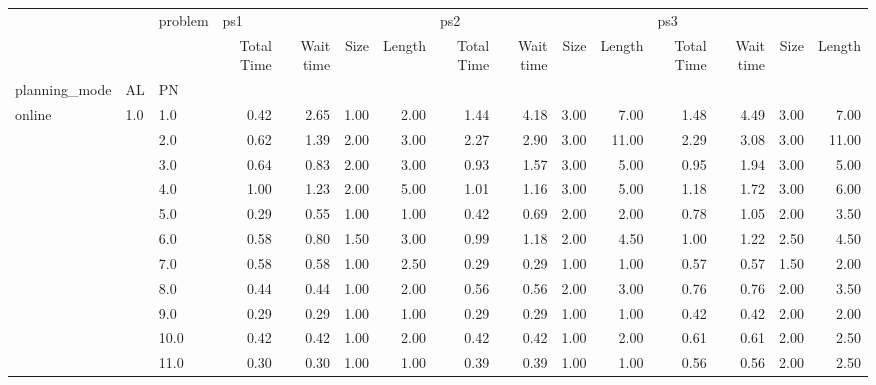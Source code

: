 \begin{tabular}{lllrrrrrrrrrrrr}
\toprule
       &     & problem & \multicolumn{4}{l}{ps1} & \multicolumn{4}{l}{ps2} & \multicolumn{4}{l}{ps3} \\
       &     & {} & Total Time & Wait time & Size & Length & Total Time & Wait time & Size & Length & Total Time & Wait time & Size & Length \\
planning\_mode & AL & PN &            &           &      &        &            &           &      &        &            &           &      &        \\
\midrule
online & 1.0 & 1.0  &       0.42 &      2.65 & 1.00 &   2.00 &       1.44 &      4.18 & 3.00 &   7.00 &       1.48 &      4.49 & 3.00 &   7.00 \\
       &     & 2.0  &       0.62 &      1.39 & 2.00 &   3.00 &       2.27 &      2.90 & 3.00 &  11.00 &       2.29 &      3.08 & 3.00 &  11.00 \\
       &     & 3.0  &       0.64 &      0.83 & 2.00 &   3.00 &       0.93 &      1.57 & 3.00 &   5.00 &       0.95 &      1.94 & 3.00 &   5.00 \\
       &     & 4.0  &       1.00 &      1.23 & 2.00 &   5.00 &       1.01 &      1.16 & 3.00 &   5.00 &       1.18 &      1.72 & 3.00 &   6.00 \\
       &     & 5.0  &       0.29 &      0.55 & 1.00 &   1.00 &       0.42 &      0.69 & 2.00 &   2.00 &       0.78 &      1.05 & 2.00 &   3.50 \\
       &     & 6.0  &       0.58 &      0.80 & 1.50 &   3.00 &       0.99 &      1.18 & 2.00 &   4.50 &       1.00 &      1.22 & 2.50 &   4.50 \\
       &     & 7.0  &       0.58 &      0.58 & 1.00 &   2.50 &       0.29 &      0.29 & 1.00 &   1.00 &       0.57 &      0.57 & 1.50 &   2.00 \\
       &     & 8.0  &       0.44 &      0.44 & 1.00 &   2.00 &       0.56 &      0.56 & 2.00 &   3.00 &       0.76 &      0.76 & 2.00 &   3.50 \\
       &     & 9.0  &       0.29 &      0.29 & 1.00 &   1.00 &       0.29 &      0.29 & 1.00 &   1.00 &       0.42 &      0.42 & 2.00 &   2.00 \\
       &     & 10.0 &       0.42 &      0.42 & 1.00 &   2.00 &       0.42 &      0.42 & 1.00 &   2.00 &       0.61 &      0.61 & 2.00 &   2.50 \\
       &     & 11.0 &       0.30 &      0.30 & 1.00 &   1.00 &       0.39 &      0.39 & 1.00 &   1.00 &       0.56 &      0.56 & 2.00 &   2.50 \\

\end{tabular}
